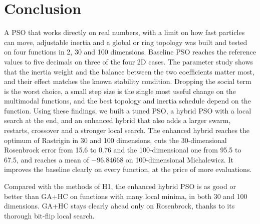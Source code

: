 \documentclass[conference]{IEEEtran}
\begin{document}
\FloatBarrier
\section{Conclusion}\label{sec:conclusion}
A PSO that works directly on real numbers, with a limit on how fast
particles can move, adjustable inertia and a global or ring topology was
built and tested on four functions in 2, 30 and 100 dimensions. Baseline PSO reaches the reference values to five decimals on three of the four 2D cases. The parameter study shows that the inertia weight and
the balance between the two coefficients matter most, and their effect
matches the known stability condition. Dropping the social term is the
worst choice, a small step size is the single most useful change on the
multimodal functions, and the best topology and inertia schedule depend on
the function. Using these findings, we built a tuned PSO, a hybrid PSO with
a local search at the end, and an enhanced hybrid that also adds a larger
swarm, restarts, crossover and a stronger local search. The enhanced hybrid
reaches the optimum of Rastrigin in 30 and 100 dimensions, cuts the
30-dimensional Rosenbrock error from 15.6 to 0.76 and the 100-dimensional
one from 95.5 to 67.5, and reaches a mean of $-96.84668$ on
100-dimensional Michalewicz. It improves the baseline clearly on every
function, at the price of more evaluations.

Compared with the methods of H1, the enhanced hybrid PSO is as good or
better than GA+HC on functions with many local minima, in both 30 and 100
dimensions. GA+HC stays clearly ahead only on Rosenbrock, thanks to its
thorough bit-flip local search.

\FloatBarrier
\end{document}
